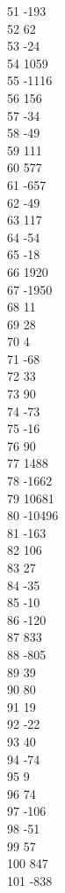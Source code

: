 { 51	-193 \\
 52	62 \\
 53	-24 \\
 54	1059 \\
 55	-1116 \\
 56	156 \\
 57	-34 \\
 58	-49 \\
 59	111 \\
 60	577 \\
 61	-657 \\
 62	-49 \\
 63	117 \\
 64	-54 \\
 65	-18 \\
 66	1920 \\
 67	-1950 \\
 68	11 \\
 69	28 \\
 70	4 \\
 71	-68 \\
 72	33 \\
 73	90 \\
 74	-73 \\
 75	-16 \\
 76	90 \\
 77	1488 \\
 78	-1662 \\
 79	10681 \\
 80	-10496 \\
 81	-163 \\
 82	106 \\
 83	27 \\
 84	-35 \\
 85	-10 \\
 86	-120 \\
 87	833 \\
 88	-805 \\
 89	39 \\
 90	80 \\
 91	19 \\
 92	-22 \\
 93	40 \\
 94	-74 \\
 95	9 \\
 96	74 \\
 97	-106 \\
 98	-51 \\
 99	57 \\
 100	847 \\
 101	-838 \\
}
